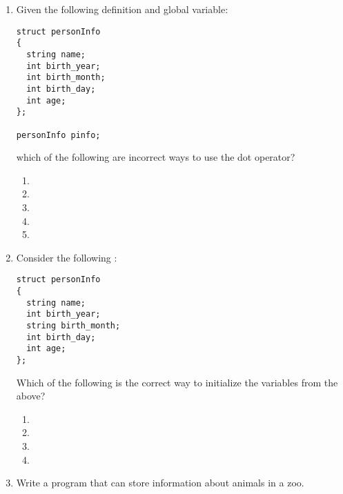 \begin{enumerate}
\item Given the following  definition and global variable:

\noindent\begin{minipage}{\linewidth}\begin{lstlisting}
struct personInfo
{
  string name;
  int birth_year;
  int birth_month;
  int birth_day;
  int age;
};

personInfo pinfo;
\end{lstlisting}\end{minipage}

\noindent which of the following are incorrect ways to use the dot operator?
  \begin{enumerate}
	\item {}
	\item {}
	\item {}
  \item {}
	\item {}
  \end{enumerate}

\item Consider the following :

\noindent\begin{minipage}{\linewidth}\begin{lstlisting}
struct personInfo
{
  string name;
  int birth_year;
  string birth_month;
  int birth_day;
  int age;
};
\end{lstlisting}\end{minipage}

Which of the following is the correct way to initialize the variables from the  above?

  \begin{enumerate}
	\item {}
	\item {}
	\item {}
	\item {}
  \end{enumerate}

\item Write a program that can store information about animals in a zoo.


\end{enumerate}
